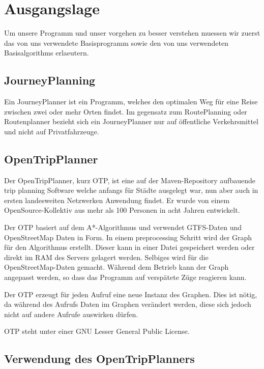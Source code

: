 \section{Ausgangslage}
Um unsere Programm und unser vorgehen zu besser verstehen muessen wir zuerst das von uns verwendete Basisprogramm sowie den von uns verwendeten Basisalgorithms erlaeutern.

\subsection{JourneyPlanning}
Ein JourneyPlanner ist ein Programm, welches den optimalen Weg für eine Reise zwischen zwei oder mehr Orten findet. Im gegensatz zum RoutePlanning oder Routenplanner bezieht sich ein JourneyPlanner nur auf öffentliche Verkehrsmittel und nicht auf Privatfahrzeuge.

\subsection{OpenTripPlanner}

Der OpenTripPlanner, kurz OTP, ist eine auf der Maven-Repository %
aufbauende trip planning Software welche anfangs für Städte ausgelegt war, nun aber auch in ersten landesweiten Netzwerken Anwendung findet. Er wurde von einem OpenSource-Kollektiv aus mehr als 100 Personen in acht Jahren entwickelt. %

Der OTP basiert auf dem A*-Algorithmus und verwendet GTFS-Daten und OpenStreetMap Daten in Form. In einem preprocessing Schritt wird der Graph für den Algorithmus erstellt. Dieser kann in einer Datei gespeichert werden oder direkt im RAM des Servers gelagert werden. Selbiges wird für die OpenStreetMap-Daten gemacht. Während dem Betrieb kann der Graph angepasst werden, so dass das Programm auf verspätete Züge reagieren kann. %

Der OTP erzeugt für jeden Aufruf eine neue Instanz des Graphen. Dies ist nötig, da während des Aufrufs Daten im Graphen verändert werden, diese sich jedoch nicht auf andere Aufrufe auswirken dürfen.

OTP steht unter einer GNU Lesser General Public License. 



\subsection{Verwendung des OpenTripPlanners}


